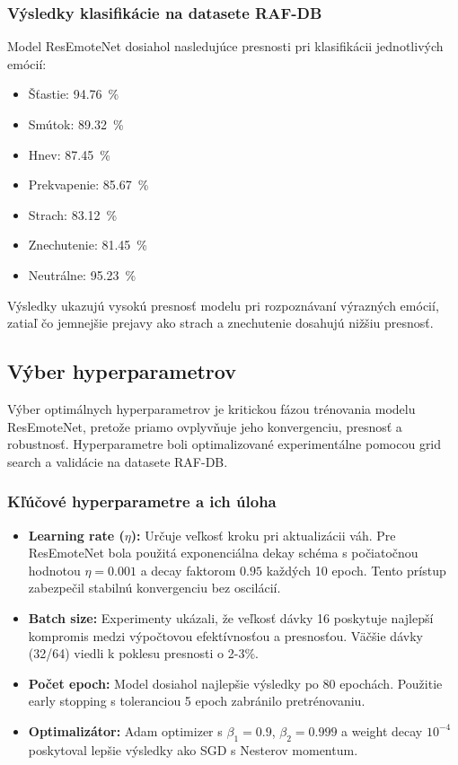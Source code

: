 \subsubsection{Výsledky klasifikácie na datasete RAF-DB}
Model ResEmoteNet dosiahol nasledujúce presnosti pri klasifikácii jednotlivých emócií:
\begin{itemize}
    \item Šťastie: 94.76~\%
    \item Smútok: 89.32~\%
    \item Hnev: 87.45~\%
    \item Prekvapenie: 85.67~\%
    \item Strach: 83.12~\%
    \item Znechutenie: 81.45~\%
    \item Neutrálne: 95.23~\%
\end{itemize}

Výsledky ukazujú vysokú presnosť modelu pri rozpoznávaní výrazných emócií, zatiaľ čo jemnejšie prejavy ako strach a znechutenie dosahujú nižšiu presnosť.


\subsection{Výber hyperparametrov}

Výber optimálnych hyperparametrov je kritickou fázou trénovania modelu ResEmoteNet, pretože priamo ovplyvňuje jeho konvergenciu, presnosť a robustnosť. Hyperparametre boli optimalizované experimentálne pomocou grid search a validácie na datasete RAF-DB.

\subsubsection{Kľúčové hyperparametre a ich úloha}

\begin{itemize}
    \item \textbf{Learning rate ($\eta$):} 
    Určuje veľkosť kroku pri aktualizácii váh. Pre ResEmoteNet bola použitá exponenciálna dekay schéma s počiatočnou hodnotou $\eta = 0.001$ a decay faktorom $0.95$ každých 10 epoch. Tento prístup zabezpečil stabilnú konvergenciu bez oscilácií.

    \item \textbf{Batch size:} 
    Experimenty ukázali, že veľkosť dávky 16 poskytuje najlepší kompromis medzi výpočtovou efektívnosťou a presnosťou. Väčšie dávky (32/64) viedli k poklesu presnosti o 2-3\%.

    \item \textbf{Počet epoch:} 
    Model dosiahol najlepšie výsledky po 80 epochách. Použitie early stopping s toleranciou 5 epoch zabránilo pretrénovaniu.

    \item \textbf{Optimalizátor:} 
    Adam optimizer s $\beta_1=0.9$, $\beta_2=0.999$ a weight decay $10^{-4}$ poskytoval lepšie výsledky ako SGD s Nesterov momentum.
\end{itemize}

